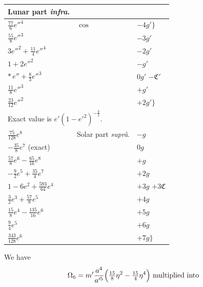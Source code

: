 \documentclass[12pt,a4paper]{article}
\theoremstyle{plain}
\begin{document}
\begin{center}
\begin{tabular}{|l|l|l|}
\hline
\multicolumn{1}{|c|}{Lunar part \textit{infra}.} & & \\
\hline
$\tfrac{77}{6}e''^{4}$                & $\cos$ & $-4g'\bigr\}$ \\
$\tfrac{55}{8}e''^{3}$                &        & $-3g'$ \\
$3e''^{2}+\tfrac{11}{4}e''^{4}$       &        & $-2g'$ \\
$1+2e''^{2}$                          &        & $-g'$ \\
$*\,e''+\tfrac{8}{3}e''^{3}$          &        & $0g'$ \quad $-\mathfrak{C}'$ \\
$\tfrac{11}{8}e''^{3}$                &        & $+g'$ \\
$\tfrac{23}{12}e''^{2}$               &        & $+2g'\bigr\}$ \\
\hline
\multicolumn{3}{|l|}{\small * Exact value is $e'(1-e'^{2})^{-\frac{3}{2}}$.} \\
\hline
$\tfrac{75}{128}e^{8}$                       & Solar part \textit{supr\`a}. & $-g$ \\
$-\tfrac{35}{8}e^{7}$ (exact)                &                              & $0g$ \\
$\tfrac{57}{8}e^{6}-\tfrac{65}{16}e^{8}$     &                              & $+g$ \\
$-\tfrac{9}{2}e^{5}+\tfrac{35}{4}e^{7}$      &                              & $+2g$ \\
$1-6e^{2}+\tfrac{593}{64}e^{4}$              &                              & $+3g$ \quad $+3\mathfrak{C}$ \\
$\tfrac{3}{2}e^{3}+\tfrac{57}{8}e^{5}$       &                              & $+4g$ \\
$\tfrac{15}{8}e^{4}-\tfrac{135}{16}e^{6}$    &                              & $+5g$ \\
$\tfrac{9}{4}e^{5}$                          &                              & $+6g$ \\
$\tfrac{343}{128}e^{6}$                      &                              & $+7g\bigr\}$ \\
\hline
\end{tabular}
\end{center}

\newpage
{} We have
\[
\Omega_{6}=m'\frac{a^{4}}{a'^{5}}\Bigl(\tfrac{15}{8}\eta^{2}-\tfrac{15}{4}\eta^{4}\Bigr)\ \text{multiplied into}
\]
\end{document}
